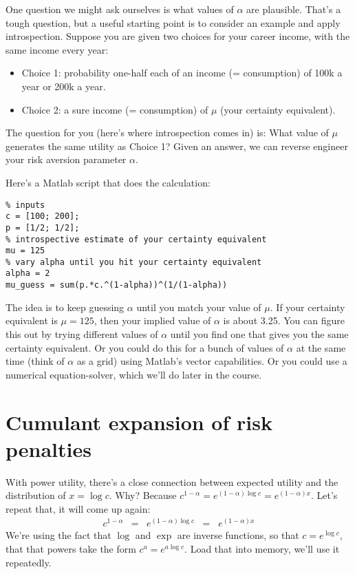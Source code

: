 \documentclass[11pt]{article}
\begin{document}
One question we might ask ourselves is what values of $\alpha$ are plausible.
That's a tough question,
but a useful starting point is to consider an example and apply introspection.
Suppose you are given two choices for your career income, with the same
income every year:
\begin{itemize}
\item Choice 1:  probability one-half each of an income (= consumption)
of 100k a year or 200k a year.
\item Choice 2:  a sure income (= consumption) of $\mu$ (your certainty equivalent).
\end{itemize}
The question for you (here's where introspection comes in) is:
What value of $\mu$ generates the same utility as Choice 1?
Given an answer, we can reverse engineer your risk aversion
parameter $\alpha$.

Here's a Matlab script that does the calculation:
\begin{verbatim}
% inputs
c = [100; 200];
p = [1/2; 1/2];
% introspective estimate of your certainty equivalent
mu = 125
% vary alpha until you hit your certainty equivalent
alpha = 2
mu_guess = sum(p.*c.^(1-alpha))^(1/(1-alpha))
\end{verbatim}
The idea is to keep guessing $\alpha$ until you match your value of $\mu$.
If your certainty equivalent is $\mu = 125$, then
your implied value of $\alpha$ is about 3.25.
You can figure this out by trying different values of $\alpha$
until you find one that gives you the same certainty equivalent.
Or you could do this for a bunch of values of $\alpha$ at the same time
(think of $\alpha$ as a grid)
using Matlab's vector capabilities.
Or you could use a numerical equation-solver,
which we'll do later in the course.


\section{Cumulant expansion of risk penalties}

With power utility, there's a close connection between expected
utility and the distribution of $ x = \log c$.
Why?
Because $c^{1-\alpha} = e^{(1-\alpha) \log c} = e^{(1-\alpha) x }$.
Let's repeat that, it will come up again:
\begin{eqnarray*}
    c^{1-\alpha} &=& e^{(1-\alpha) \log c} \;\;=\;\; e^{(1-\alpha) x }
\end{eqnarray*}
We're using the fact that $\log$ and $\exp$ are inverse functions,
so that $ c = e^{\log c} $,
that that powers take the form $c^a = e^{a \log c} $.
Load that into memory, we'll use it repeatedly.
\end{document}

